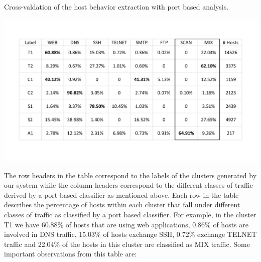 \begin{table}[b]
	\caption{Cross-valdation of the host behavior extraction with port based analysis.}%
	\centerline{\includegraphics[scale = 0.5]{validation.pdf}}	
\end{table}

The row headers in the table correspond to the labels of the clusters generated by our system while the column headers correspond to the different classes of traffic derived by a port based classifier as mentioned above. Each row in the table describes the percentage of hosts within each cluster that fall under different classes of traffic as classified by a port based classifier. For example, in the cluster T1 we have 60.88\% of hosts that are using web applications, 0.86\% of hosts are involved in DNS traffic, 15.03\% of hosts exchange SSH, 0.72\% exchange TELNET traffic and 22.04\% of the hosts in this cluster are classified as MIX traffic. Some important observations from this table are:

